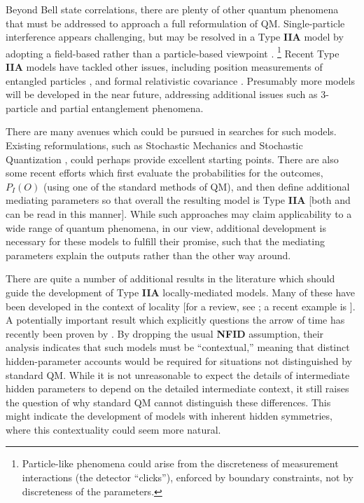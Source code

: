 \documentclass[onecolumn, nofootinbib, 12pt]{revtex4-1}
\begin{document}
Beyond Bell state correlations, there are plenty of other quantum phenomena that must be addressed to approach a full reformulation of QM\@.  Single-particle interference appears challenging, but may be resolved in a Type {\bf IIA} model by adopting a field-based rather than a particle-based viewpoint \cite{wharton2018}.%
\footnote{Particle-like phenomena could arise from the discreteness of measurement interactions (the detector ``clicks''), enforced by boundary constraints, not by discreteness of the parameters.}
Recent Type {\bf IIA} models have tackled other issues, including position measurements of entangled particles \cite{sen2018}, and formal relativistic covariance \cite{wharton2010b,heaney2013,sutherland2017}.  Presumably more models will be developed in the near future, addressing additional issues such as 3-particle and partial entanglement phenomena.

There are many avenues which could be pursued in searches for such models.  Existing reformulations, such as Stochastic Mechanics \cite{nelson1966,nelson2012} and Stochastic Quantization \cite{damgaard1987}, could perhaps provide excellent starting points.  There are also some recent efforts which first evaluate the probabilities for the outcomes, $P_I(O)$ (using one of the standard methods of QM), and then define additional mediating parameters so that overall the resulting model is Type {\bf IIA} [both \textcite{sutherland2017} and \textcite{drummond2019} can be read in this manner].  While such approaches may claim applicability to a wide range of quantum phenomena, in our view, additional development is necessary for these models to fulfill their promise, such that the mediating parameters explain the outputs rather than the other way around.

There are quite a number of additional results in the literature which should guide the development of Type {\bf IIA} locally-mediated models.  Many of these have been developed in the context of locality [for a review, see \textcite{brunner2014}; a recent example is \textcite{carmi2018}].  A potentially important result which explicitly questions the arrow of time has recently been proven by \textcite{shrapnel2017}.  By dropping the usual {\bf NFID} assumption, their analysis indicates that such models must be ``contextual,'' meaning that distinct hidden-parameter accounts would be required for situations not distinguished by standard QM.  While it is not unreasonable to expect the details of intermediate hidden parameters to depend on the detailed intermediate context, it still raises the question of why standard QM cannot distinguish these differences.  This might indicate the development of models with inherent hidden symmetries, where this contextuality could seem more natural.
\end{document}
